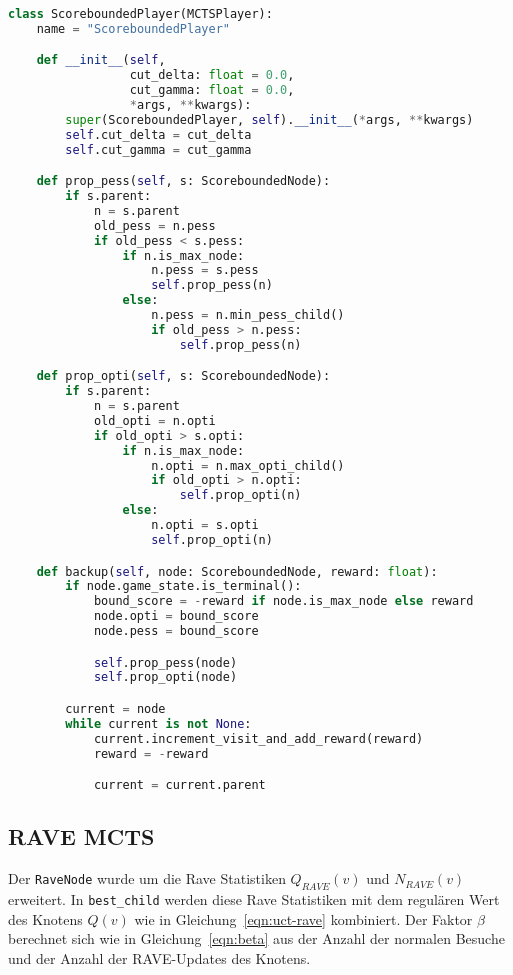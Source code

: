 \begin{lstlisting}[language=Python,label={lst:scorebounded-player}]
class ScoreboundedPlayer(MCTSPlayer):
    name = "ScoreboundedPlayer"

    def __init__(self,
                 cut_delta: float = 0.0,
                 cut_gamma: float = 0.0,
                 *args, **kwargs):
        super(ScoreboundedPlayer, self).__init__(*args, **kwargs)
        self.cut_delta = cut_delta
        self.cut_gamma = cut_gamma

    def prop_pess(self, s: ScoreboundedNode):
        if s.parent:
            n = s.parent
            old_pess = n.pess
            if old_pess < s.pess:
                if n.is_max_node:
                    n.pess = s.pess
                    self.prop_pess(n)
                else:
                    n.pess = n.min_pess_child()
                    if old_pess > n.pess:
                        self.prop_pess(n)

    def prop_opti(self, s: ScoreboundedNode):
        if s.parent:
            n = s.parent
            old_opti = n.opti
            if old_opti > s.opti:
                if n.is_max_node:
                    n.opti = n.max_opti_child()
                    if old_opti > n.opti:
                        self.prop_opti(n)
                else:
                    n.opti = s.opti
                    self.prop_opti(n)

    def backup(self, node: ScoreboundedNode, reward: float):
        if node.game_state.is_terminal():
            bound_score = -reward if node.is_max_node else reward
            node.opti = bound_score
            node.pess = bound_score

            self.prop_pess(node)
            self.prop_opti(node)

        current = node
        while current is not None:
            current.increment_visit_and_add_reward(reward)
            reward = -reward

            current = current.parent
\end{lstlisting}


\subsection{RAVE MCTS}

Der \verb|RaveNode| wurde um die Rave Statistiken $Q_{RAVE}(v)$ und $N_{RAVE}(v)$ erweitert.
In \verb|best_child| werden diese Rave Statistiken mit dem regulären Wert des Knotens $Q(v)$ wie in Gleichung~\ref{eqn:uct-rave} kombiniert.
Der Faktor $\beta$ berechnet sich wie in Gleichung~\ref{eqn:beta} aus der Anzahl der normalen Besuche und der Anzahl der RAVE-Updates des Knotens.

